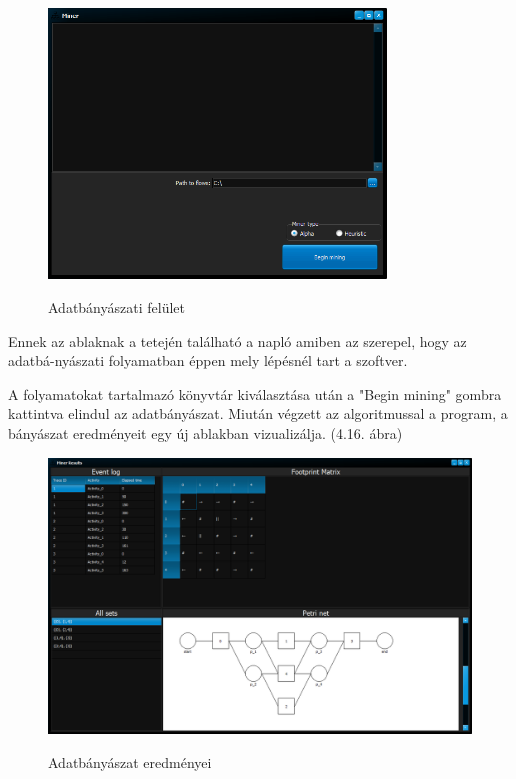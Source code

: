 \begin{figure}[h!]
	\begin{center}
		\includegraphics[width=0.8\textwidth, keepaspectratio=true]{images/img_datamining_ui}\\
		\caption{Adatbányászati felület}
		\label{fig:example}
	\end{center}
\end{figure}

Ennek az ablaknak a tetején található a napló amiben az szerepel, hogy az adatbá\hyp{}nyászati folyamatban éppen mely lépésnél tart a szoftver.

A folyamatokat tartalmazó könyvtár kiválasztása után a "Begin mining" gombra kattintva elindul az adatbányászat. Miután végzett az algoritmussal a program, a bányászat eredményeit egy új ablakban vizualizálja. (4.16. ábra)

\begin{figure}[h!]
	\begin{center}
		\includegraphics[width=\textwidth, keepaspectratio=true]{images/img_datamining_results}\\
		\caption{Adatbányászat eredményei}
		\label{fig:example}
	\end{center}
\end{figure}





















